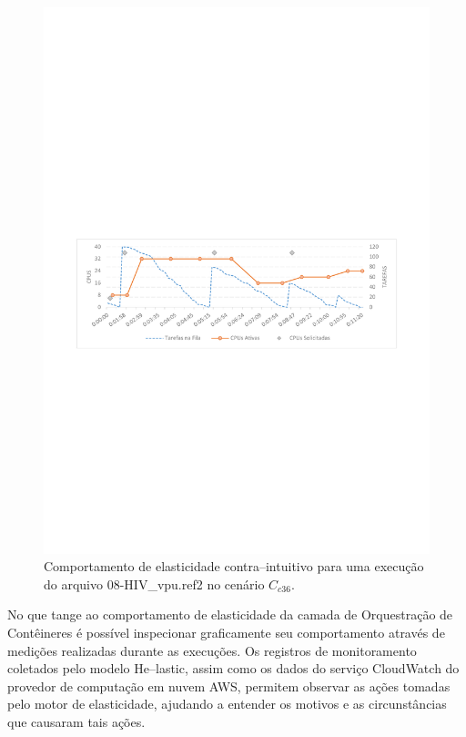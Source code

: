 \documentclass[english,brazilian]{UNISINOSmonografia} %
\begin{document}
\begin{figure}[p]
	\centering%
	\begin{minipage}{\textwidth}
		\caption{Comportamento de elasticidade contra--intuitivo para uma execução do arquivo 08-HIV\_vpu.ref2 no cenário $C_{c36}$.}
		\label{fig:results-modelo-batch-41HIV}
		\vspace{1ex}
		\includegraphics[trim=60 325 60 360,clip,width=\textwidth]{2018-12-16T11-41-09_HIV_vpu}
	\end{minipage}
\end{figure}


No que tange ao comportamento de elasticidade da camada de Orquestração de Contêineres é possível inspecionar graficamente seu comportamento através de medições realizadas durante as execuções.
%
Os registros de monitoramento coletados pelo modelo \textsf{He}--lastic, assim como os dados do serviço CloudWatch do provedor de computação em nuvem AWS, permitem observar as ações tomadas pelo motor de elasticidade, ajudando a entender os motivos e as circunstâncias que causaram tais ações.
\end{document}
